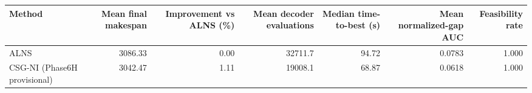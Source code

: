\begin{tabular}{lrrrrrr}
\toprule
Method & Mean final makespan & Improvement vs ALNS (\%) & Mean decoder evaluations & Median time-to-best (s) & Mean normalized-gap AUC & Feasibility rate \\
\midrule
ALNS & 3086.33 & 0.00 & 32711.7 & 94.72 & 0.0783 & 1.000 \\
CSG-NI (Phase6H provisional) & 3042.47 & 1.11 & 19008.1 & 68.87 & 0.0618 & 1.000 \\
\bottomrule
\end{tabular}
